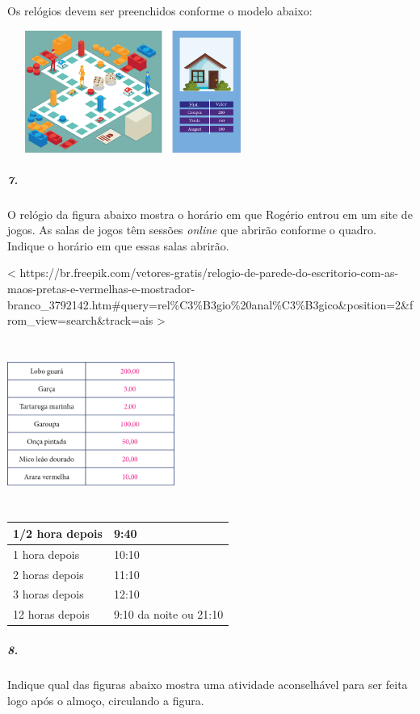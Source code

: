Os relógios devem ser preenchidos conforme o modelo abaixo:


\includegraphics[width=3.23958in,height=1.57255in]{media/image62.png}

\subparagraph{7.}\label{section-49}

O relógio da figura abaixo mostra o horário em que Rogério entrou em um
site de jogos. As salas de jogos têm sessões \emph{online} que abrirão
conforme o quadro. Indique o horário em que essas salas abrirão.

\textless{}
https://br.freepik.com/vetores-gratis/relogio-de-parede-do-escritorio-com-as-maos-pretas-e-vermelhas-e-mostrador-branco\_3792142.htm\#query=rel\%C3\%B3gio\%20anal\%C3\%B3gico\&position=2\&from\_view=search\&track=ais
\textgreater{}

\includegraphics[width=2.15625in,height=2.15625in]{media/image63.png}

\begin{longtable}[]{@{}ll@{}}
\toprule
1/2 hora depois & 9:40\tabularnewline
\midrule
\endhead
1 hora depois & 10:10\tabularnewline
2 horas depois & 11:10\tabularnewline
3 horas depois & 12:10\tabularnewline
12 horas depois & 9:10 da noite ou 21:10\tabularnewline
\bottomrule
\end{longtable}

\subparagraph{8.}\label{section-50}

Indique qual das figuras abaixo mostra uma atividade aconselhável para
ser feita logo após o almoço, circulando a figura.

